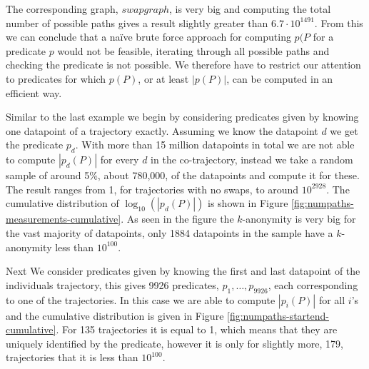 \documentclass[12pt]{article}
\newcommand{\data}{d}
\newcommand{\pred}{p}
\newcommand{\paths}{P}
\theoremstyle{definition}
\begin{document}
The corresponding graph, \(swapgraph\), is very big and computing the
total number of possible paths gives a result slightly greater than
\(6.7 \cdot 10^{1491}\). From this we can conclude that a naïve brute
force approach for computing \(\pred(\paths\) for a predicate
\(\pred\) would not be feasible, iterating through all possible paths
and checking the predicate is not possible. We therefore have to
restrict our attention to predicates for which \(\pred(\paths)\), or
at least \(|\pred(\paths)|\), can be computed in an efficient way.

Similar to the last example we begin by considering predicates given
by knowing one datapoint of a trajectory exactly. Assuming we know the
datapoint \(\data\) we get the predicate \(\pred_{\data}\). With more
than 15 million datapoints in total we are not able to compute
\(|\pred_{\data}(\paths)|\) for every \(\data\) in the co-trajectory,
instead we take a random sample of around 5\%, about 780,000, of the
datapoints and compute it for these. The result ranges from 1, for
trajectories with no swaps, to around \(10^{2928}\). The cumulative
distribution of \(\log_{10}(|\pred_{\data}(\paths)|)\) is shown in
Figure \ref{fig:numpaths-measurements-cumulative}. As seen in the
figure the \(k\)-anonymity is very big for the vast majority of
datapoints, only 1884 datapoints in the sample have a \(k\)-anonymity
less than \(10^{100}\).

Next We consider predicates given by knowing the first and last
datapoint of the individuals trajectory, this gives 9926 predicates,
\(\pred_{1}, \dots, \pred_{9926}\), each corresponding to one of the
trajectories. In this case we are able to compute
\(|\pred_{i}(\paths)|\) for all \(i\)'s and the cumulative
distribution is given in Figure
\ref{fig:numpaths-startend-cumulative}. For 135 trajectories it is
equal to 1, which means that they are uniquely identified by the
predicate, however it is only for slightly more, 179, trajectories
that it is less than \(10^{100}\).
\end{document}
